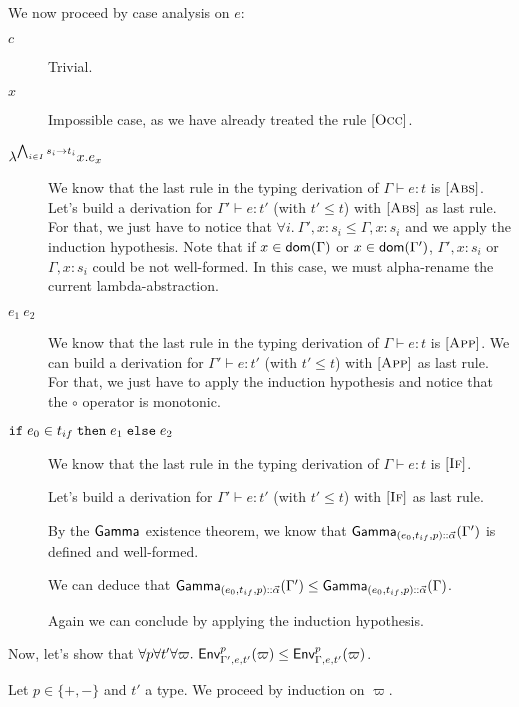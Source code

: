 \documentclass[a4paper]{article}
\theoremstyle{definition}
\begin{document}
      We now proceed by case analysis on $e$:
      \begin{description}
        \item[$c$] Trivial.
        \item[$x$] Impossible case, as we have already treated the rule $[\textsc{Occ}]$.
        \item[$\lambda^{\bigwedge_{i\in I} s_i\to t_i}x.e_x$] We know that the last rule in the typing derivation of $\Gamma \vdash e:t$ is $[\textsc{Abs}]$.
        Let's build a derivation for $\Gamma' \vdash e:t'$ (with $t'\leq t$) with $[\textsc{Abs}]$ as last rule.
        For that, we just have to notice that $\forall i.\ \Gamma',x:s_i \leq \Gamma,x:s_i$ and we apply the induction hypothesis.
        Note that if $x \in \textsf{dom}(\Gamma)$ or $x \in \textsf{dom}(\Gamma')$, $\Gamma',x:s_i$ or $\Gamma,x:s_i$ could be not well-formed.
        In this case, we must alpha-rename the current lambda-abstraction.

        \item[$e_1\ e_2$] We know that the last rule in the typing derivation of $\Gamma \vdash e:t$ is $[\textsc{App}]$.
        We can build a derivation for $\Gamma' \vdash e:t'$ (with $t'\leq t$) with $[\textsc{App}]$ as last rule.
        For that, we just have to apply the induction hypothesis and notice that the $\circ$ operator is monotonic.
        \item[$\texttt{if}\;e_0\in t_{if}\;\texttt{then}\;e_1\;\texttt{else}\;e_2$]
        We know that the last rule in the typing derivation of $\Gamma \vdash e:t$ is $[\textsc{If}]$.

        Let's build a derivation for $\Gamma' \vdash e:t'$ (with $t'\leq t$) with $[\textsc{If}]$ as last rule.

        By the $\textsf{Gamma}_{}$ existence theorem, we know that $\textsf{Gamma}_{{(e_0,t_{if},p)}\textsf{::}{\vec \alpha}}(\Gamma')$ is defined and well-formed.

        We can deduce that $\textsf{Gamma}_{{(e_0,t_{if},p)}\textsf{::}{\vec \alpha}}(\Gamma') \leq \textsf{Gamma}_{{(e_0,t_{if},p)}\textsf{::}{\vec \alpha}}(\Gamma)$.

        Again we can conclude by applying the induction hypothesis.\\
      \end{description}
  
      Now, let's show that $\forall p \forall t' \forall \varpi.\ \textsf{Env}^{p}_{\Gamma',e,t'} (\varpi) \leq \textsf{Env}^{p}_{\Gamma,e,t'} (\varpi)$.
  
      Let $p\in \{+,-\}$ and $t'$ a type.
      We proceed by induction on $\varpi$.
      
\end{document}
